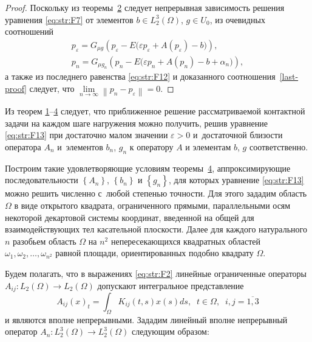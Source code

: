 \begin{proof}
Поскольку из теоремы~\hyperlink{str:th2}{2} следует непрерывная зависимость решения уравнения \eqref{eq:str:F7} от элементов $b\in L_{2}^{3} (\Omega)$, $g\in U_{0} $, из очевидных соотношений
\begin{gather}
p_{\varepsilon } =G_{\mu g} \left(p_{\varepsilon } -E  \bigl(\varepsilon   p_{\varepsilon } +A\left(p_{\varepsilon } \right)-b\bigr)\right),
\\
p_{n} =G_{\mu g_{n} } \left(p_{n} -E  \bigl(\varepsilon   p_{n} +A\left(p_{n} \right)-b+\alpha _{n} \bigr)\right),
\end{gather}
а также из последнего равенства \eqref{eq:str:F12} и доказанного соотношения~\eqref{last-proof} следует, что $\mathop{\lim }\limits_{n\to \infty } \left\| p_{n} -p_{\varepsilon } \right\| =0$.
\end{proof}


Из теорем \hyperlink{str:th1}{1}--\hyperlink{str:th4}{4} следует, что приближенное решение рассматриваемой контактной задачи на каждом шаге нагружения можно получить, решив уравнение \eqref{eq:str:F13} при достаточно малом значении $\varepsilon >0$ и~достаточной близости оператора $A_{n} $ и~элементов $b_{n} $, $g_{n} $ к оператору $A$ и элементам $b$, $g$ соответственно.


Построим такие удовлетворяющие условиям теоремы~\hyperlink{str:th4}{4}, аппроксимирующие последовательности $\left\{A_{n} \right\}$, $\left\{b_{n} \right\}$ и $\left\{g_{n} \right\}$, для которых уравнение \eqref{eq:str:F13} можно решить численно с~любой степенью точности.
Для этого зададим область $\Omega $ в виде открытого квадрата, ограниченного прямыми, параллельными осям некоторой декартовой системы координат, введенной на общей для взаимодействующих тел касательной плоскости.
Далее для каждого натурального $n$ разобьем область $\Omega $ на $n^{2} $ непересекающихся квадратных областей $\omega _{1} ,\omega _{2} ,\dots ,\omega _{n^{2} } $ равной площади, ориентированных подобно квадрату $\Omega $.

Будем полагать, что в выражениях \eqref{eq:str:F2} линейные ограниченные операторы $A_{ij} \colon L_{2} (\Omega)\to L_{2} (\Omega)$ допускают интегральное представление
$$A_{ij} (x)_{t} =\int _{\Omega }K_{ij} (t, s) x(s)ds, \; \; t\in \Omega , \; \; i,j=\overline{1, 3}$$ 
и являются вполне непрерывными.
Зададим линейный вполне непрерывный оператор $A_{n}\colon L_{2}^{3} (\Omega)\to L_{2}^{3} (\Omega)$ следующим образом:


